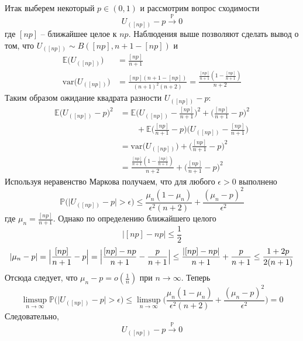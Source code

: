 \documentclass[a4paper]{article}
\newcommand{\ex}[0]{{\mathbb{E}}}
\newcommand{\pr}[0]{{\mathbb{P}}}
\newcommand{\var}[0]{\text{var}}
\begin{document}
Итак выберем некоторый $p\in (0,1)$ и рассмотрим вопрос сходимости
\[U_{([np])} - p \overset{\pr}{\to} 0\]
где $[np]$ -- ближайшее целое к $np$. Наблюдения выше позволяют сделать вывод о том,
что $U_{([np])}\sim B([np], n+1-[np])$ и
\begin{align*}
	\ex\bigl(U_{([np])}\bigr)
		&= \frac{[np]}{n+1}\\
	\var\bigl(U_{([np])}\bigr)
		&= \frac{[np](n+1-[np])}{(n+1)^2(n+2)}
		= \frac{\frac{[np]}{n+1}(1-\frac{[np]}{n+1})}{n+2}
\end{align*}
Таким образом ожидание квадрата разности $U_{([np])} - p$:
\begin{align*}
	\ex\bigl(U_{([np])} - p\bigr)^2
	&= \ex\bigl(U_{([np])} - \frac{[np]}{n+1}\bigr)^2 + \bigl(\frac{[np]}{n+1}-p\bigr)^2 \\
	&\quad\quad + \ex\bigl(\frac{[np]}{n+1}-p\bigr)\bigl(U_{([np])} - \frac{[np]}{n+1}\bigr)\\
	&= \var\bigl(U_{([np])}\bigr) + \bigl(\frac{[np]}{n+1}-p\bigr)^2 \\
	&= \frac{\frac{[np]}{n+1}(1-\frac{[np]}{n+1})}{n+2} + \bigl(\frac{[np]}{n+1}-p\bigr)^2
\end{align*}
Используя неравенство Маркова получаем, что для любого $\epsilon>0$ выполнено
\[
\pr\bigl( \lvert U_{([np])} - p\rvert > \epsilon \bigr)
\leq \frac{\mu_n(1-\mu_n)}{\epsilon^2(n+2)} + \frac{(\mu_n-p)^2}{\epsilon^2}
\]
где $\mu_n = \frac{[np]}{n+1}$. Однако по определению ближайшего целого
\[\lvert[np]-np\rvert \leq \frac{1}{2}\]
\[
\lvert \mu_n-p \rvert
= \Bigl\lvert \frac{[np]}{n+1}-p \Bigr\rvert
= \Bigl\lvert \frac{[np]-np}{n+1}-\frac{p}{n+1} \Bigr\rvert
\leq \frac{\lvert[np]-np\rvert}{n+1}+\frac{p}{n+1}
\leq \frac{1+2p}{2(n+1)}
\]
Отсюда следует, что $\mu_n - p = o(\frac{1}{n})$ при $n\to\infty$. Теперь
\[
\limsup_{n\to \infty} \pr\bigl( \lvert U_{([np])} - p\rvert > \epsilon \bigr)
\leq \limsup_{n\to \infty} \bigl(\frac{\mu_n(1-\mu_n)}{\epsilon^2(n+2)}
	+ \frac{(\mu_n-p)^2}{\epsilon^2}\bigr)
= 0
\]
Следовательно,
\[U_{([np])} - p \overset{\pr}{\to} 0\]
\end{document}
